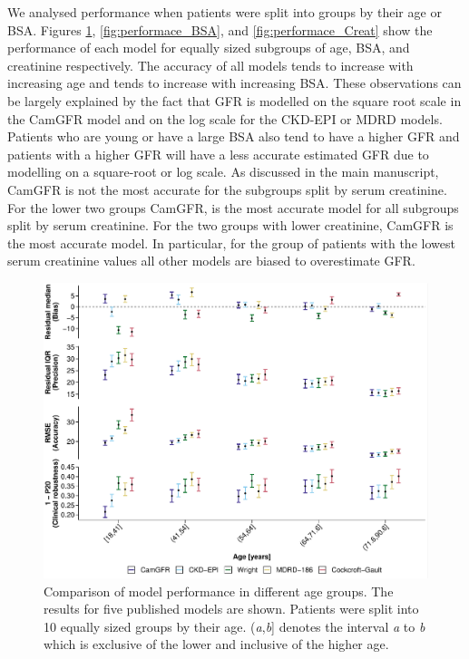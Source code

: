 \documentclass[11pt,]{article}
\begin{document}
We analysed performance when patients were split into groups by their
age or BSA. Figures \ref{fig:performace_age}, \ref{fig:performace_BSA},
and \ref{fig:performace_Creat} show the performance of each model for
equally sized subgroups of age, BSA, and creatinine respectively. The
accuracy of all models tends to increase with increasing age and tends
to increase with increasing BSA. These observations can be largely
explained by the fact that GFR is modelled on the square root scale in
the CamGFR model and on the log scale for the CKD-EPI or MDRD models.
Patients who are young or have a large BSA also tend to have a higher
GFR and patients with a higher GFR will have a less accurate estimated
GFR due to modelling on a square-root or log scale. As discussed in the
main manuscript, CamGFR is not the most accurate for the subgroups split
by serum creatinine. For the lower two groups CamGFR, is the most
accurate model for all subgroups split by serum creatinine. For the two
groups with lower creatinine, CamGFR is the most accurate model. In
particular, for the group of patients with the lowest serum creatinine
values all other models are biased to overestimate GFR.

\begin{figure}
\centering
\includegraphics{1_Validation_nonIDMS_resubmission_files/figure-latex/PLOT_performance_age-1.pdf}
\caption{\label{fig:performace_age}Comparison of model performance in
different age groups. The results for five published models are shown.
Patients were split into 10 equally sized groups by their age.
(\emph{a},\emph{b}{]} denotes the interval \emph{a} to \emph{b} which is
exclusive of the lower and inclusive of the higher age.}
\end{figure}
\end{document}
